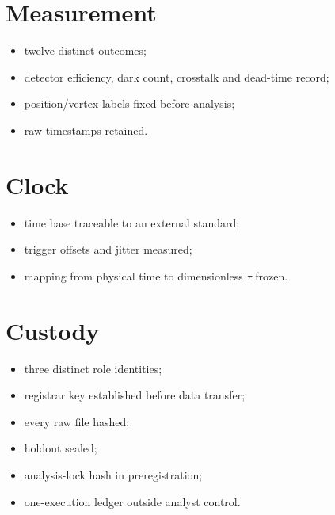 \documentclass[11pt,a4paper,openany]{report}
\begin{document}
\section{Measurement}

\begin{itemize}
\item 
twelve distinct outcomes;

\item 
detector efficiency, dark count, crosstalk and dead-time record;

\item 
position/\allowbreak{}vertex labels fixed before analysis;

\item 
raw timestamps retained.

\end{itemize}

\section{Clock}

\begin{itemize}
\item 
time base traceable to an external standard;

\item 
trigger offsets and jitter measured;

\item 
mapping from physical time to dimensionless \(\tau\) frozen.

\end{itemize}

\section{Custody}

\begin{itemize}
\item 
three distinct role identities;

\item 
registrar key established before data transfer;

\item 
every raw file hashed;

\item 
holdout sealed;

\item 
analysis-lock hash in preregistration;

\item 
one-execution ledger outside analyst control.

\end{itemize}
\end{document}
